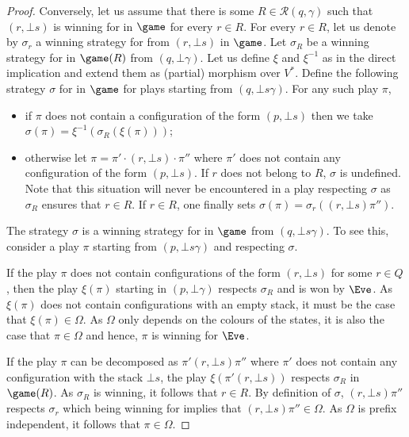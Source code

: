 \begin{proof}
Conversely, let us assume that there is some $R\in\mathcal{R}(q,\gamma)$ such that $(r,\bot s)$ is winning for \Eve in $\game$ for every $r\in R$. For every $r\in R$, let us denote by $\sigma_r$ a winning strategy for \Eve from $(r,\bot s)$ in $\game$. Let $\sigma_R$ be a winning strategy for \Eve in $\game(R)$ from $(q,\bot\gamma)$. Let us define $\xi$ and $\xi^{-1}$ as in the direct implication and extend them as (partial) morphism over $V^*$. Define the following strategy $\sigma$ for \Eve in $\game$ for plays starting from $(q,\bot s\gamma)$. For any such play $\pi$, 
\begin{itemize}
\item if $\pi$ does not contain a configuration of the form $(p,\bot s)$ then we take $\sigma(\pi)=\xi^{-1}(\sigma_R(\xi(\pi)))$;
\item otherwise let $\pi = \pi'\cdot(r,\bot s)\cdot \pi''$ where $\pi'$ does not contain any configuration of the form $(p,\bot s)$. If $r$ does not belong to $R$, $\sigma$ is undefined. Note that this situation will never be encountered in a play respecting $\sigma$ as $\sigma_R$ ensures that $r \in R$. If $r \in R$, one finally sets $\sigma(\pi)=\sigma_r((r,\bot s)\pi'')$.
\end{itemize} 
The strategy $\sigma$ is a winning strategy for \Eve in $\game$ from $(q,\bot s\gamma)$. To see this, consider a play $\pi$ starting from $(p,\bot s \gamma)$ and respecting $\sigma$.

 If the play $\pi$ does not contain configurations of the form $(r,\bot s)$ for some $r \in Q$, then the play $\xi(\pi)$ starting in $(p,\bot \gamma)$ respects $\sigma_R$ and is won by $\Eve$.
As $\xi(\pi)$ does not contain configurations with an empty stack, it must be the case that $\xi(\pi) \in \Omega$. As $\Omega$ only depends on the colours of the states, it is also the case that $\pi \in \Omega$ and hence, $\pi$ is winning for $\Eve$. 

If the play $\pi$ can be decomposed as $\pi' (r,\bot s) \pi''$ where $\pi'$ does not contain any configuration with the stack $\bot s$, the play $\xi(\pi' (r,\bot s))$ respects $\sigma_R$ in $\game(R)$. As $\sigma_R$ is winning, it follows that $r \in R$. By definition of $\sigma$, $(r,\bot s)\pi''$ respects $\sigma_r$ which being winning for \Eve implies that $(r,\bot s) \pi'' \in \Omega$. As $\Omega$ is prefix independent, it follows that $\pi \in \Omega$.
\end{proof}


